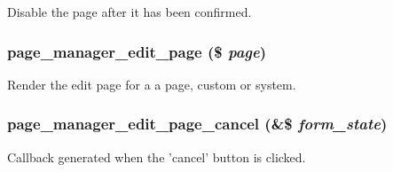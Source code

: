 \label{page__manager_8admin_8inc_a371e6b2f2287ca725b866c1f2c6312d6}
Disable the page after it has been confirmed. \hypertarget{page__manager_8admin_8inc_aabc0ee81d4ff6bb8566ff3d67ff74798}{
\subsubsection[{page\_\-manager\_\-edit\_\-page}]{\setlength{\rightskip}{0pt plus 5cm}page\_\-manager\_\-edit\_\-page (\$ {\em page})}}
\label{page__manager_8admin_8inc_aabc0ee81d4ff6bb8566ff3d67ff74798}
Render the edit page for a a page, custom or system. \hypertarget{page__manager_8admin_8inc_aec78e2899a33f799e9f4ebe0f3839711}{
\subsubsection[{page\_\-manager\_\-edit\_\-page\_\-cancel}]{\setlength{\rightskip}{0pt plus 5cm}page\_\-manager\_\-edit\_\-page\_\-cancel (\&\$ {\em form\_\-state})}}
\label{page__manager_8admin_8inc_aec78e2899a33f799e9f4ebe0f3839711}
Callback generated when the 'cancel' button is clicked.

